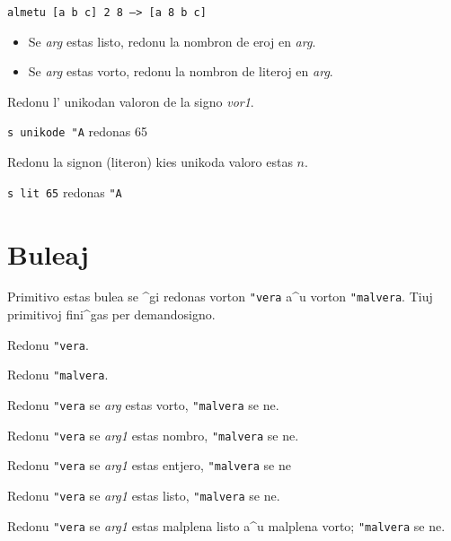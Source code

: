 \texttt{almetu [a b c] 2 8 ---> [a 8 b c]}


\begin{itemize}
 \item Se \textit{arg} estas listo, redonu la nombron de eroj en \textit{arg}.
 \item Se \textit{arg} estas vorto, redonu la nombron de literoj en \textit{arg}.
\end{itemize}


Redonu l' unikodan valoron de la signo \og \textit{vor1}\fg.

\texttt{s unikode "A} redonas 65


Redonu la signon (literon) kies unikoda valoro estas $n$.

\texttt{s lit 65} redonas \texttt{"A}

\section{Buleaj}

Primitivo estas bulea se ^gi redonas vorton \texttt{"vera} a^u vorton
\texttt{"malvera}.  Tiuj primitivoj fini^gas per demandosigno.


Redonu \texttt{"vera}.


Redonu \texttt{"malvera}.


Redonu \texttt{"vera} se \textit{arg} estas vorto, \texttt{"malvera}
se ne.


Redonu \texttt{"vera} se \textit{arg1} estas nombro, \texttt{"malvera}
se ne.


Redonu \texttt{"vera} se \textit{arg1} estas entjero,
\texttt{"malvera} se ne


Redonu \texttt{"vera} se \textit{arg1} estas listo, \texttt{"malvera}
se ne.


Redonu \texttt{"vera} se \textit{arg1} estas malplena listo a^u
malplena vorto; \texttt{"malvera} se ne.

